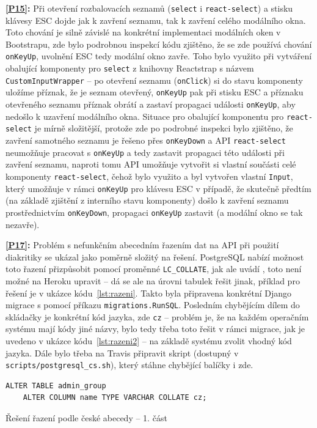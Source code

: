 \textbf{\ref{P15}:} Při otevření rozbalovacích seznamů (\verb|select| i \verb|react-select|) a stisku klávesy ESC dojde jak k zavření seznamu, tak k zavření celého modálního okna. Toto chování je silně závislé na konkrétní implementaci modálních oken v Bootstrapu, zde bylo podrobnou inspekcí kódu zjištěno, že se zde používá chování \verb|onKeyUp|, uvolnění ESC tedy modální okno zavře. Toho bylo využito při vytváření obalující komponenty pro \verb|select| z knihovny Reactstrap s názvem \verb|CustomInputWrapper| -- po otevření seznamu (\verb|onClick|) si do stavu komponenty uložíme příznak, že je seznam otevřený, \verb|onKeyUp| pak při stisku ESC a příznaku otevřeného seznamu příznak obrátí a zastaví propagaci události \verb|onKeyUp|, aby nedošlo k uzavření modálního okna. Situace pro obalující komponentu pro \verb|react-select| je mírně složitější, protože zde po podrobné inspekci bylo zjištěno, že zavření samotného seznamu je řešeno přes \verb|onKeyDown| a API \verb|react-select| neumožňuje pracovat s \verb|onKeyUp| a tedy zastavit propagaci této události při zavření seznamu, naproti tomu API umožňuje vytvořit si vlastní součásti celé komponenty \verb|react-select|, čehož bylo využito a byl vytvořen vlastní \verb|Input|, který umožňuje v rámci \verb|onKeyUp| pro klávesu ESC v případě, že skutečně předtím (na základě zjištění z interního stavu komponenty) došlo k zavření seznamu prostřednictvím \verb|onKeyDown|, propagaci \verb|onKeyUp| zastavit (a modální okno se tak nezavře).

\textbf{\ref{P17}:} Problém s nefunkčním abecedním řazením dat na API při použití diakritiky se ukázal jako poměrně složitý na řešení. PostgreSQL nabízí možnost toto řazení přizpůsobit pomocí proměnné \verb|LC_COLLATE|, jak ale uvádí \cite{heroku-razeni}, toto není možné na Heroku upravit -- dá se ale na úrovni tabulek řešit jinak, příklad pro řešení je v ukázce kódu~\ref{lst:razeni}. Takto byla připravena konkrétní Django migrace s pomocí příkazu \verb|migrations.RunSQL|. Posledním chybějícím dílem do skládačky je konkrétní kód jazyka, zde \verb|cz| -- problém je, že na každém operačním systému mají kódy jiné názvy, bylo tedy třeba toto řešit v rámci migrace, jak je uvedeno v ukázce kódu~\ref{lst:razeni2} -- na základě systému zvolit vhodný kód jazyka. Dále bylo třeba na Travis připravit skript (dostupný v \verb|scripts/postgresql_cs.sh|), který stáhne chybějící balíčky i zde.

\begin{listing}[ht]
	\begin{verbatim}
ALTER TABLE admin_group
    ALTER COLUMN name TYPE VARCHAR COLLATE cz;
	\end{verbatim}
	\caption{Řešení řazení podle české abecedy -- 1. část}\label{lst:razeni}
\end{listing}

